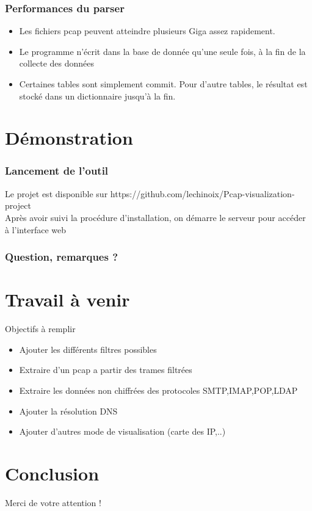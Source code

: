\documentclass{beamer}
\begin{document}
  \begin{frame}
    \frametitle{Performances du parser}
    \begin{itemize}
     \item Les fichiers pcap peuvent atteindre plusieurs Giga assez rapidement. \\
     \item Le programme n'écrit dans la base de donnée qu'une seule fois, à la fin de la collecte des données
     \item Certaines tables sont simplement commit. Pour d'autre tables, le résultat est stocké dans un dictionnaire jusqu'à la fin.
    \end{itemize}
  \end{frame}
  



  
 \section{Démonstration}
  \begin{frame}
    \frametitle{Lancement de l'outil}
    Le projet est disponible sur https://github.com/lechinoix/Pcap-visualization-project  \\
    Après avoir suivi la procédure d'installation, on démarre le serveur pour accéder à l'interface web \\
  \end{frame}


  \begin{frame}
    \frametitle{Question, remarques ?}
  \end{frame}

  \section{Travail à venir}
  \begin{frame}
    Objectifs à remplir
    \begin{itemize}
     \item Ajouter les différents filtres possibles
     \item Extraire d'un pcap a partir des trames filtrées
     \item Extraire les données non chiffrées des protocoles SMTP,IMAP,POP,LDAP
     \item Ajouter la résolution DNS
     \item Ajouter d'autres mode de visualisation (carte des IP,..)
    \end{itemize}
  \end{frame}


  \section{Conclusion}
  \begin{frame}
    \begin{center}
      Merci de votre attention !
    \end{center}
  \end{frame}
\end{document}
